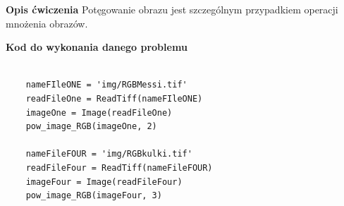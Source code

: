 \documentclass[magisterska,openany]{pracadypl}
\begin{document}
\vspace{0.5cm}\textbf{\Large Opis ćwiczenia}
\vspace{0.25cm}\newline
Potęgowanie obrazu jest szczególnym przypadkiem operacji mnożenia obrazów.
\newline
\newline

\vspace{0.5cm}
\textbf{\Large Kod do wykonania danego problemu}
\lstset{language=Python}
\vspace{0.25cm}
\begin{lstlisting}

	nameFIleONE = 'img/RGBMessi.tif'
	readFileOne = ReadTiff(nameFIleONE)
	imageOne = Image(readFileOne)
	pow_image_RGB(imageOne, 2)
	
	nameFileFOUR = 'img/RGBkulki.tif'
	readFileFour = ReadTiff(nameFileFOUR)
	imageFour = Image(readFileFour)
	pow_image_RGB(imageFour, 3)

\end{lstlisting}
\end{document}
